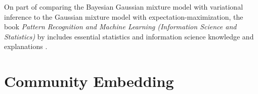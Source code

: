 \documentclass[conference]{IEEEtran}
\begin{document}
On part of comparing the Bayesian Gaussian mixture model with variational inference to the Gaussian mixture model with expectation-maximization, the \citeyear{Bishop06} book \textit{Pattern Recognition and Machine Learning (Information Science and Statistics)} by \citeauthor{Bishop06} includes essential statistics and information science knowledge and explanations \cite{Bishop06}.

\section{Community Embedding}






\end{document}
